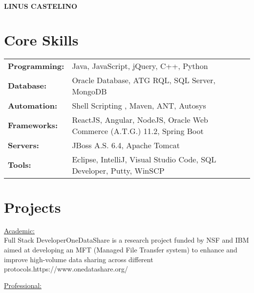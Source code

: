 \documentclass[letter]{twentysecondcv}
\begin{document}
{\fontsize{28pt}{12pt}\selectfont\color{mainblue}\textbf{LINUS CASTELINO}} \\

\fontsize{10.5pt}{10pt}
\makeprofile %

\section{Core Skills}

\begin{tabular}{p{2.5cm}p{10.5cm}}
	\textbf{Programming:} & {Java, JavaScript, jQuery, C++, Python}\\
 	\textbf{Database:} & {Oracle Database, ATG RQL, SQL Server, MongoDB}\\
 	\textbf{Automation:} & {Shell Scripting , Maven, ANT, Autosys}\\
 	\textbf{Frameworks:} & {ReactJS, Angular, NodeJS, Oracle Web Commerce (A.T.G.) 11.2, Spring Boot}\\ 
 	\textbf{Servers:} & {JBoss A.S. 6.4, Apache Tomcat}\\
    \textbf{Tools:} & {Eclipse, IntelliJ, Visual Studio Code, SQL Developer, Putty, WinSCP}
    \vspace{5mm}
\end{tabular}

\section{Projects}

\begin{twenty} 
    \underline{Academic:}\\
	 {Full Stack Developer}{OneDataShare is a research project funded by NSF and IBM aimed at developing an MFT (Managed File Transfer system) to enhance and improve high-volume data sharing across different protocols.}{https://www.onedatashare.org/}
	
	
	\underline{Professional:}\\
\end{twenty}
\end{document}
